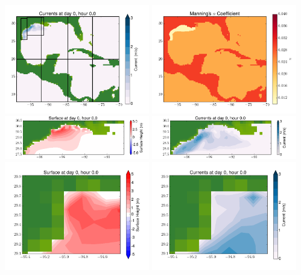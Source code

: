 \documentclass[11pt]{article}
\begin{document}
\includegraphics[width=0.475\textwidth]{frame0072fig2.png}
\vskip 10pt 
\includegraphics[width=0.475\textwidth]{frame0072fig3.png}
\includegraphics[width=0.475\textwidth]{frame0072fig4.png}
\vskip 10pt 
\includegraphics[width=0.475\textwidth]{frame0072fig5.png}
\includegraphics[width=0.475\textwidth]{frame0072fig6.png}
\vskip 10pt 
\includegraphics[width=0.475\textwidth]{frame0072fig7.png}
\end{document}

